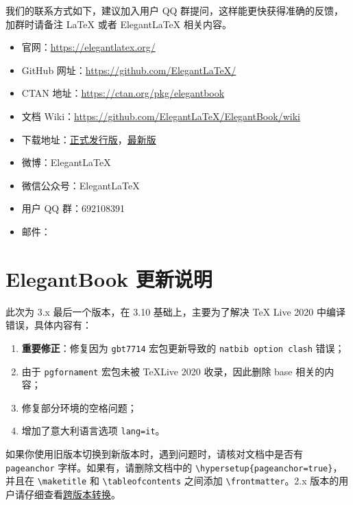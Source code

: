\documentclass[cn,11pt]{elegantbook}
\begin{document}
我们的联系方式如下，建议加入用户 QQ 群提问，这样能更快获得准确的反馈，加群时请备注 \LaTeX{} 或者 Elegant\LaTeX{} 相关内容。
\begin{itemize}
  \item 官网：\href{https://elegantlatex.org/}{https://elegantlatex.org/}
  \item GitHub 网址：\href{https://github.com/ElegantLaTeX/}{https://github.com/ElegantLaTeX/}
  \item CTAN 地址：\href{https://ctan.org/pkg/elegantbook}{https://ctan.org/pkg/elegantbook}
  \item 文档 Wiki：\href{https://github.com/ElegantLaTeX/ElegantBook/wiki}{https://github.com/ElegantLaTeX/ElegantBook/wiki}
  \item 下载地址：\href{https://github.com/ElegantLaTeX/ElegantBook/releases}{正式发行版}，\href{https://github.com/ElegantLaTeX/ElegantBook/archive/master.zip}{最新版}
  \item 微博：Elegant\LaTeX{}
  \item 微信公众号：Elegant\LaTeX{}
  \item 用户 QQ 群：692108391 
  \item 邮件：
\end{itemize}


\section{ElegantBook 更新说明}

此次为 3.x 最后一个版本，在 3.10 基础上，主要为了解决 \TeX{} Live 2020 中编译错误，具体内容有：

\begin{enumerate}
  \item \textbf{重要修正}：修复因为 \lstinline{gbt7714} 宏包更新导致的 \lstinline{natbib option clash} 错误；
  \item 由于 \lstinline{pgfornament} 宏包未被 \TeX Live 2020 收录，因此删除 base 相关的内容；
  \item 修复部分环境的空格问题；
  \item 增加了意大利语言选项 \lstinline{lang=it}。
\end{enumerate}

\begin{note}
如果你使用旧版本切换到新版本时，遇到问题时，请核对文档中是否有 \lstinline{pageanchor} 字样。如果有，请删除文档中的 \lstinline|\hypersetup{pageanchor=true}|，并且在 \lstinline{\maketitle} 和 \lstinline{\tableofcontents} 之间添加 \lstinline{\frontmatter}。2.x 版本的用户请仔细查看\href{https://github.com/ElegantLaTeX/ElegantBook/wiki/convert}{跨版本转换}。
\end{note}
\end{document}
